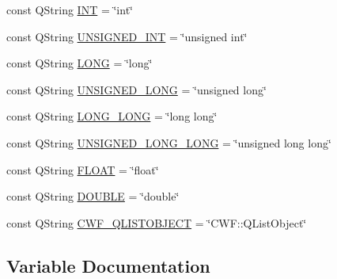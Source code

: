 \begin{DoxyCompactItemize}
\item 
const Q\+String \hyperlink{namespace_c_s_t_l_1_1_s_u_p_p_o_r_t_e_d___t_y_p_e_s_abfc0cae6923cdccac4baf40f977e48be}{I\+NT} = \char`\"{}int\char`\"{}
\item 
const Q\+String \hyperlink{namespace_c_s_t_l_1_1_s_u_p_p_o_r_t_e_d___t_y_p_e_s_ad5061e9800a3dcac56b3c537a8bcae1a}{U\+N\+S\+I\+G\+N\+E\+D\+\_\+\+I\+NT} = \char`\"{}unsigned int\char`\"{}
\item 
const Q\+String \hyperlink{namespace_c_s_t_l_1_1_s_u_p_p_o_r_t_e_d___t_y_p_e_s_a48e9f7dd252ff4b67a583943a17134e6}{L\+O\+NG} = \char`\"{}long\char`\"{}
\item 
const Q\+String \hyperlink{namespace_c_s_t_l_1_1_s_u_p_p_o_r_t_e_d___t_y_p_e_s_ac0aabeb6e40b272af10e93d40ec8bded}{U\+N\+S\+I\+G\+N\+E\+D\+\_\+\+L\+O\+NG} = \char`\"{}unsigned long\char`\"{}
\item 
const Q\+String \hyperlink{namespace_c_s_t_l_1_1_s_u_p_p_o_r_t_e_d___t_y_p_e_s_a548c39479bc2de6d7ca5141419c32bd5}{L\+O\+N\+G\+\_\+\+L\+O\+NG} = \char`\"{}long long\char`\"{}
\item 
const Q\+String \hyperlink{namespace_c_s_t_l_1_1_s_u_p_p_o_r_t_e_d___t_y_p_e_s_aedde1eb55d7f7da0c828af98472cb0f9}{U\+N\+S\+I\+G\+N\+E\+D\+\_\+\+L\+O\+N\+G\+\_\+\+L\+O\+NG} = \char`\"{}unsigned long long\char`\"{}
\item 
const Q\+String \hyperlink{namespace_c_s_t_l_1_1_s_u_p_p_o_r_t_e_d___t_y_p_e_s_aa8a9e91fc6fdf7334fca2296c39f5d23}{F\+L\+O\+AT} = \char`\"{}float\char`\"{}
\item 
const Q\+String \hyperlink{namespace_c_s_t_l_1_1_s_u_p_p_o_r_t_e_d___t_y_p_e_s_a0a19685a1529f17dd07e30472ea4d814}{D\+O\+U\+B\+LE} = \char`\"{}double\char`\"{}
\item 
const Q\+String \hyperlink{namespace_c_s_t_l_1_1_s_u_p_p_o_r_t_e_d___t_y_p_e_s_aece5b1e04313642f6f0cb34c4cf5bfc8}{C\+W\+F\+\_\+\+Q\+L\+I\+S\+T\+O\+B\+J\+E\+CT} = \char`\"{}C\+W\+F\+::\+Q\+List\+Object\char`\"{}
\end{DoxyCompactItemize}


\subsection{Variable Documentation}
\mbox{\label{namespace_c_s_t_l_1_1_s_u_p_p_o_r_t_e_d___t_y_p_e_s_aef17b5d3400db03148b665032dff3593}} 
